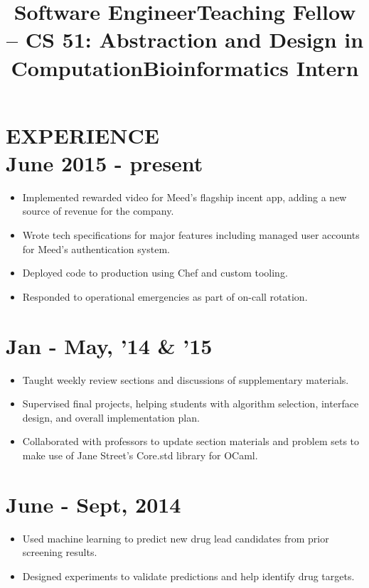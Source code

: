 \documentclass[centered, margin, 10pt]{res} %
\newcommand\mainsectionfont{\normalsize\bf\textup}
\newcommand\subsectionfont{\small\textmd\textup}
\renewcommand\sectionfont{\mainsectionfont} %
\renewcommand\dates{\section} %
\newenvironment{rlist}
    {\begin{minipage}[t]{\linewidth}\begin{itemize}\raggedright}
    {\end{itemize}\end{minipage}}
\newenvironment{positionlist}
    {\begin{position}\begin{rlist}}
    {\end{rlist}\end{position}}
\begin{document}
\begin{resume}

\renewcommand\sectionfont{\subsectionfont} %

\section{{\mainsectionfont EXPERIENCE} \\ June 2015 - present }
\title{Software Engineer}
\begin{positionlist}
  \item Implemented rewarded video for Meed's flagship incent app, adding a new
    source of revenue for the company.
  \item Wrote tech specifications for major features including managed user
    accounts for Meed's authentication system.
  \item Deployed code to production using Chef and custom tooling.
  \item Responded to operational emergencies as part of on-call rotation.
\end{positionlist}

\title{Teaching Fellow -- CS 51: Abstraction and Design in Computation}
\dates{Jan - May, '14 \& '15}
\begin{positionlist}
  \item Taught weekly review sections and discussions of supplementary
    materials.
  \item Supervised final projects, helping students with algorithm selection,
    interface design, and overall implementation plan.
  \item Collaborated with professors to update section materials and problem
    sets to make use of Jane Street's Core.std library for OCaml.
\end{positionlist}

\title{Bioinformatics Intern}
\dates{June - Sept, 2014}
\begin{positionlist}
  \item Used machine learning to predict new drug lead candidates from prior
    screening results.
  \item Designed experiments to validate predictions and help identify drug
    targets.
\end{positionlist}


\end{resume}
\end{document}
